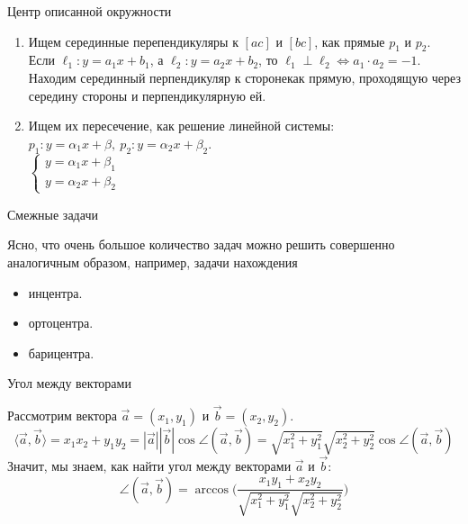\documentclass[12pt,aspectratio=169,svgnames]{beamer}
\begin{document}
\begin{frame}{Центр описанной окружности}

	\begin{enumerate}

	    \item Ищем серединные перепендикуляры к $[ac]$ и $[bc]$, как прямые $p_1$ и $p_2$.\\
			  Если $\ell_1\colon y = a_1x + b_1$, а $\ell_2\colon y = a_2 x + b_2$, то $\ell_1 \perp \ell_2 \Leftrightarrow a_1 \cdot a_2 = -1$.\\
			  Находим серединный перпендикуляр к сторонекак прямую, проходящую через середину стороны и перпендикулярную ей.

		\item Ищем их пересечение, как решение линейной системы: \\
			$p_1\colon y = \alpha_1 x + \beta, \ p_2\colon y = \alpha_2 x + \beta_2$.\\
			$\begin{cases} y = \alpha_1 x + \beta_1 \\ y = \alpha_2 x + \beta_2 \end{cases}$
	\end{enumerate}

\end{frame}

\begin{frame}{Смежные задачи}

	Ясно, что очень большое количество задач можно решить совершенно аналогичным образом, например, задачи
	нахождения

	\begin{itemize}

		\item инцентра.

		\item ортоцентра.

		\item  барицентра.
	\end{itemize}
\end{frame}

\begin{frame}{Угол между векторами}

	Рассмотрим вектора $\vec{a} = (x_1, y_1)$ и $\vec{b} = (x_2, y_2)$.
	\[ \langle \vec{a}, \vec{b} \rangle = x_1 x_2 + y_1 y_2 = |\vec{a}||\vec{b}| \cos{\angle{(\vec{a}, \vec{b})}} = \sqrt{x_1^2 + y_1^2}\sqrt{x_2^2 + y_2^2} \cos{\angle(\vec{a}, \vec{b})}\]
	Значит, мы знаем, как найти угол между векторами $\vec{a}$ и $\vec{b}$:
	\[ \angle(\vec{a}, \vec{b}) = \arccos\bigg(\frac{x_1 y_1 + x_2 y_2}{\sqrt{x_1^2 + y_1^2} \sqrt{x_2^2 + y_2^2}}\bigg) \]

\end{frame}
\end{document}
